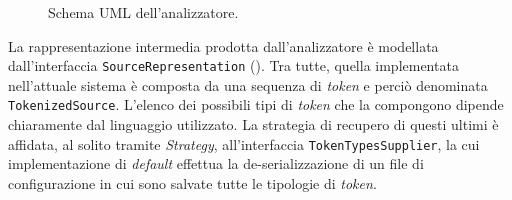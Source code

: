 \begin{figure}[h!]
    \caption{Schema UML dell'analizzatore.}
    \label{img:02-analyzer}
\end{figure}

La rappresentazione intermedia prodotta dall'analizzatore è modellata dall'interfaccia \texttt{SourceRepresentation} (). 
%
Tra tutte, quella implementata nell'attuale sistema è composta da una sequenza di \textit{token} e perciò denominata \texttt{TokenizedSource}.
%
L'elenco dei possibili tipi di \textit{token} che la compongono dipende chiaramente dal linguaggio utilizzato.
%
La strategia di recupero di questi ultimi è affidata, al solito tramite \textit{Strategy}, all'interfaccia \texttt{TokenTypesSupplier}, la cui implementazione di \textit{default} effettua la de-serializzazione di un file di configurazione in cui sono salvate tutte le tipologie di \textit{token}.

